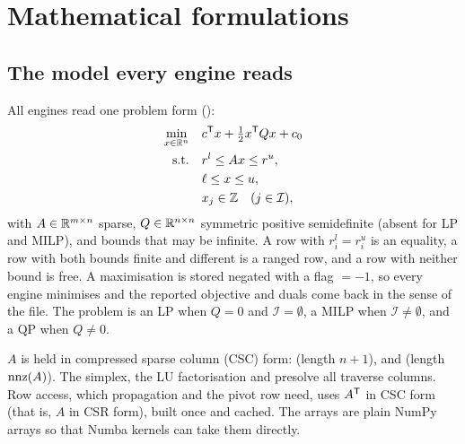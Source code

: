 \section{Mathematical formulations}\label{sec:formulation}

\subsection{The model every engine reads}
All engines read one problem form ():
\begin{equation}\label{eq:model}
\begin{aligned}
  \min_{x\in\mathbb{R}^n}\quad & c^{\mathsf{T}} x + \tfrac12 x^{\mathsf{T}} Q x + c_0\\
  \text{s.t.}\quad & r^{l} \le A x \le r^{u},\\
  & \ell \le x \le u,\\
  & x_j\in\mathbb{Z} \quad (j\in\mathcal{I}),
\end{aligned}
\end{equation}
with $A\in\mathbb{R}^{m\times n}$ sparse, $Q\in\mathbb{R}^{n\times n}$ symmetric positive semidefinite (absent for
LP and MILP), and bounds that may be infinite. A row with $r^l_i=r^u_i$ is an equality, a row with
both bounds finite and different is a ranged row, and a row with neither bound is free. A
maximisation is stored negated with a flag $=-1$, so every engine minimises and the
reported objective and duals come back in the sense of the file. The problem is an LP when
$Q=0$ and $\mathcal{I}=\emptyset$, a MILP when $\mathcal{I}\ne\emptyset$, and a QP when $Q\ne0$.

$A$ is held in compressed sparse column (CSC) form:  (length $n+1$), 
and  (length $\operatorname{nnz}(A)$). The simplex, the LU factorisation and presolve all traverse
columns. Row access, which propagation and the pivot row need, uses $A^{\mathsf{T}}$ in CSC form (that is,
$A$ in CSR form), built once and cached. The arrays are plain NumPy arrays so that Numba kernels
can take them directly.

